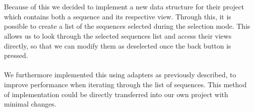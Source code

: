 \\\\ 
Because of this we decided to implement a new data structure for their project which contains both a sequence and its respective view. Through this, it is possible to create a list of the sequences selected during the selection mode. This allows us to look through the selected sequences list and access their views directly, so that we can modify them as deselected once the back button is pressed. \\\\
We furthermore implemented this using adapters as previously described, to improve performance when iterating through the list of sequences. This method of implementation could be directly transferred into our own project with minimal changes.